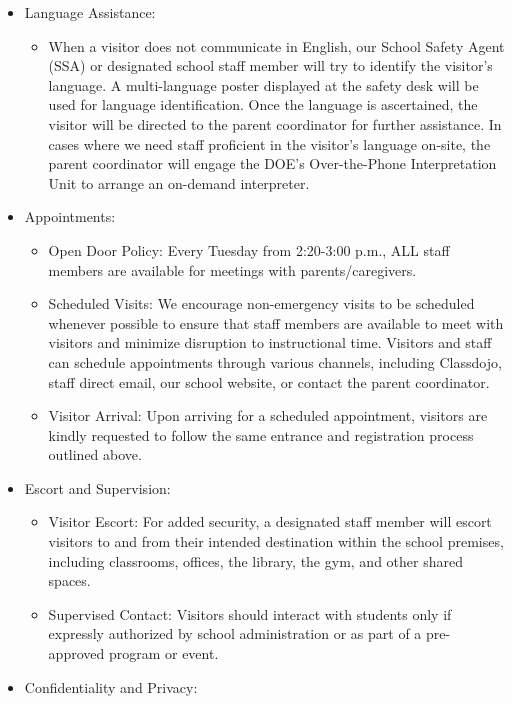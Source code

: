 \documentclass[12pt,letterpaper]{article}
\begin{document}
\begin{itemize}
\begin{itemize}
		\end{itemize}
	\item Language Assistance:
		\begin{itemize}
		\item When a visitor does not communicate in English, our School Safety Agent (SSA) or designated school staff member will try to identify the visitor's language. A multi-language poster displayed at the safety desk will be used for language identification. Once the language is ascertained, the visitor will be directed to the parent coordinator for further assistance. In cases where we need staff proficient in the visitor's language on-site, the parent coordinator will engage the DOE's Over-the-Phone Interpretation Unit to arrange an on-demand interpreter.
		\end{itemize}
\pagebreak
\vspace*{1.5cm}
	\item Appointments:
		\begin{itemize}
		\item Open Door Policy: Every Tuesday from 2:20-3:00 p.m., ALL staff members are available for meetings with parents/caregivers.
		\item Scheduled Visits: We encourage non-emergency visits to be scheduled whenever possible to ensure that staff members are available to meet with visitors and minimize disruption to instructional time. Visitors and staff can schedule appointments through various channels, including Classdojo, staff direct email, our school website, or contact the parent coordinator.
		\item Visitor Arrival: Upon arriving for a scheduled appointment, visitors are kindly requested to follow the same entrance and registration process outlined above.
		\end{itemize}
	\item Escort and Supervision:
		\begin{itemize}
		\item Visitor Escort: For added security, a designated staff member will escort visitors to and from their intended destination within the school premises, including classrooms, offices, the library, the gym, and other shared spaces.
		\item Supervised Contact: Visitors should interact with students only if expressly authorized by school administration or as part of a pre-approved program or event.
		\end{itemize}
	\item Confidentiality and Privacy:

\end{itemize}
\end{document}
